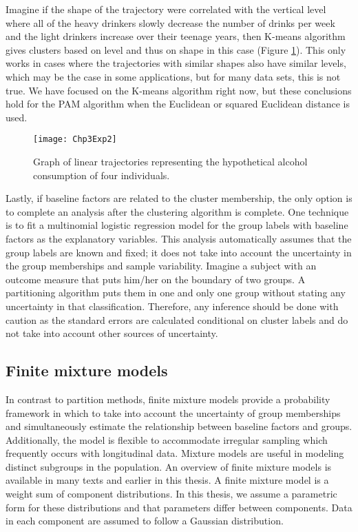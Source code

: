 Imagine if the shape of the trajectory were correlated with the vertical level where all of the heavy drinkers slowly decrease the number of drinks per week and the light drinkers increase over their teenage years, then K-means algorithm gives clusters based on level and thus on shape in this case (Figure \ref{fig:3-2}). This only works in cases where the trajectories with similar shapes also have similar levels, which may be the case in some applications, but for many data sets, this is not true. We have focused on the K-means algorithm right now, but these conclusions hold for the PAM algorithm when the Euclidean or squared Euclidean distance is used.
\begin{figure}
\begin{center}
\texttt{[image: Chp3Exp2]}
\end{center}
\caption{Graph of linear trajectories representing the hypothetical alcohol consumption of four individuals.}
\label{fig:3-2} 
\end{figure}

Lastly, if baseline factors are related to the cluster membership, the only option is to complete an analysis after the clustering algorithm is complete. One technique is to fit a multinomial logistic regression model for the group labels with baseline factors as the explanatory variables. This analysis automatically assumes that the group labels are known and fixed; it does not take into account the uncertainty in the group memberships and sample variability. Imagine a subject with an outcome measure that puts him/her on the boundary of two groups. A partitioning algorithm puts them in one and only one group without stating any uncertainty in that classification. Therefore, any inference should be done with caution as the standard errors are calculated conditional on cluster labels and do not take into account other sources of uncertainty.
\subsection{Finite mixture models}
In contrast to partition methods, finite mixture models provide a probability framework in which to take into account the uncertainty of group memberships and simultaneously estimate the relationship between baseline factors and groups. Additionally, the model is flexible to accommodate irregular sampling which frequently occurs with longitudinal data. Mixture models are useful in modeling distinct subgroups in the population. An overview of finite mixture models is available in many texts \cite{everitt1981,mclachlan1988,mclachlan2000} and earlier in this thesis. A finite mixture model is a weight sum of component distributions. In this thesis, we assume a parametric form for these distributions and that parameters differ between components. Data in each component are assumed to follow a Gaussian distribution.

